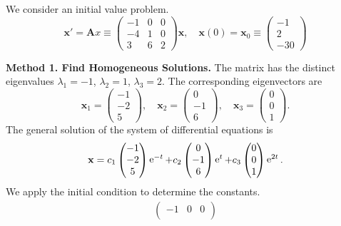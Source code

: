 {\begin{Solution}
  \label{solution x'=(-100-410362)x}
  We consider an initial value problem.
  \[
  \mathbf{x}' = \mathbf{A} x \equiv
  \begin{pmatrix}
    -1 & 0 & 0 \\
    -4 & 1 & 0 \\
    3 & 6 & 2
  \end{pmatrix} 
  \mathbf{x}, \quad 
  \mathbf{x}(0) = \mathbf{x}_0 \equiv
  \begin{pmatrix}
    -1 \\
    2 \\
    -30
  \end{pmatrix}
  \]


  \textbf{Method 1.  Find Homogeneous Solutions.}
  The matrix has the distinct eigenvalues 
  $\lambda_1 = -1$, $\lambda_2 = 1$, $\lambda_3 = 2$.  The corresponding eigenvectors are 
  \[
  \mathbf{x}_1 = \begin{pmatrix} -1 \\ -2 \\ 5 \end{pmatrix}, \quad
  \mathbf{x}_2 = \begin{pmatrix} 0 \\ -1 \\ 6 \end{pmatrix}, \quad
  \mathbf{x}_3 = \begin{pmatrix} 0 \\ 0 \\ 1 \end{pmatrix}.
  \]
  The general solution of the system of differential equations is
  \[
  \mathbf{x} = 
  c_1 \begin{pmatrix} -1 \\ -2 \\ 5 \end{pmatrix} \mathop{\mathrm{e}}\nolimits^{-t}
  + c_2 \begin{pmatrix} 0 \\ -1 \\ 6 \end{pmatrix} \mathop{\mathrm{e}}\nolimits^t
  + c_3 \begin{pmatrix} 0 \\ 0 \\ 1 \end{pmatrix} \mathop{\mathrm{e}}\nolimits^{2 t}.
  \]
  We apply the initial condition to determine the constants.
  \begin{gather*}
    \begin{pmatrix}
      -1 & 0 & 0 \\

\end{pmatrix}
\end{gather*}
\end{Solution}}
